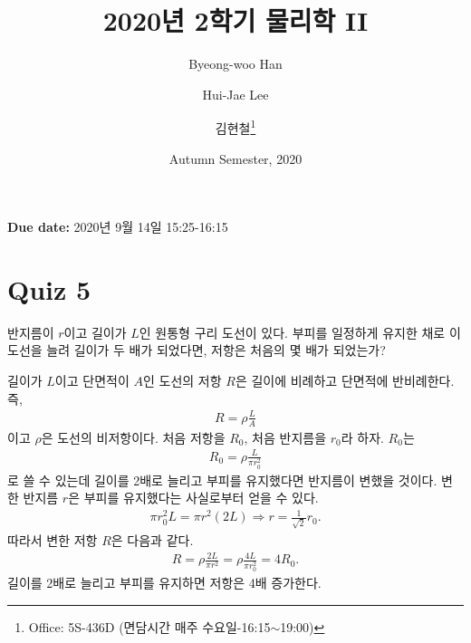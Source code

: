 \documentclass[tightenlines,floatfix,nofootinbib,superscriptaddress,fleqn]{revtex4-2}
\begin{document}
\title{\Large 2020년 2학기 물리학 II}

\author{Byeong-woo Han} 
  \author{Hui-Jae Lee} 
  \author{김현철\footnote{Office: 5S-436D (면담시간 매주
  수요일-16:15$\sim$19:00)}} 
\date{Autumn Semester, 2020}


\maketitle

{\color{red} {\bf Due date:} 2020년 9월 14일  15:25-16:15 }
\vspace{1.cm}

\section*{\large Quiz 5}
 반지름이 $r$이고 길이가 $L$인 원통형
구리 도선이 있다. 부피를 일정하게 유지한 채로 이 도선을 늘려 길이가 두
배가 되었다면, 저항은 처음의 몇 배가 되었는가? 
\vspace{0.5cm}

길이가 $L$이고 단면적이 $A$인 도선의 저항 $R$은 길이에 비례하고 단면적에 반비례한다. 즉,
\begin{align}
  R=\rho\frac{L}{A}
\end{align}
이고 $\rho$은 도선의 비저항이다. 처음 저항을 $R_0$, 처음 반지름을 $r_0$라 하자. 
$R_0$는
\begin{align}
  R_0 = \rho\frac{L}{\pi r^2_0}
\end{align}
로 쓸 수 있는데 길이를 2배로 늘리고 부피를 유지했다면 반지름이 변했을 것이다. 변한 반지름 $r$은
부피를 유지했다는 사실로부터 얻을 수 있다.
\begin{align}
  \pi r^2_0 L = \pi r^2(2L)\Longrightarrow r = \frac{1}{\sqrt{2}}r_0.
\end{align}
따라서 변한 저항 $R$은 다음과 같다.
\begin{align}
  R = \rho\frac{2L}{\pi r^2}=\rho\frac{4L}{\pi r_0^2}=4R_0.
\end{align}
길이를 2배로 늘리고 부피를 유지하면 저항은 4배 증가한다.
\vspace{0.5cm}
\end{document}
